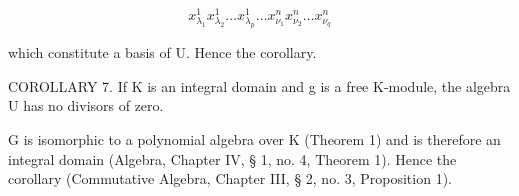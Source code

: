 \[
x _ {\lambda_ {1}} ^ {1} x _ {\lambda_ {2}} ^ {1} \dots x _ {\lambda_ {p}} ^ {1} \dots x _ {\nu_ {1}} ^ {n} x _ {\nu_ {2}} ^ {n} \dots x _ {\nu_ {q}} ^ {n}
\]

which constitute a basis of U. Hence the corollary.

COROLLARY 7. If K is an integral domain and g is a free K-module, the algebra U has no divisors of zero.

G is isomorphic to a polynomial algebra over K (Theorem 1) and is therefore an integral domain (Algebra, Chapter IV, § 1, no. 4, Theorem 1). Hence the corollary (Commutative Algebra, Chapter III, § 2, no. 3, Proposition 1).

